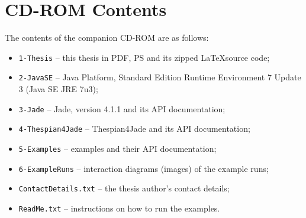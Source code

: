 
\chapter{CD-ROM Contents}

The contents of the companion CD-ROM are as follows:

\begin{itemize}
	\item \texttt{1-Thesis} -- this thesis in PDF, PS and its zipped \LaTeX source code;
	\item \texttt{2-JavaSE} -- Java Platform, Standard Edition Runtime Environment 7 Update 3 (Java SE JRE 7u3);
	\item \texttt{3-Jade} -- Jade, version 4.1.1 and its API documentation;
	\item \texttt{4-Thespian4Jade} -- Thespian4Jade and its API documentation;
	\item \texttt{5-Examples} -- examples and their API documentation;
	\item \texttt{6-ExampleRuns} -- interaction diagrams (images) of the example runs;
	\item \texttt{ContactDetails.txt} -- the thesis author's contact details;
	\item \texttt{ReadMe.txt} -- instructions on how to run the examples.
\end{itemize}